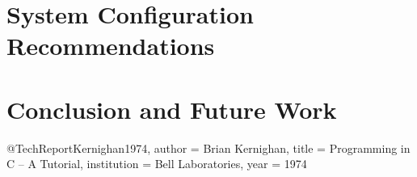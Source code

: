 \documentclass[english, version-2020-11]{uzl-thesis}
\begin{document}
\chapter{System Configuration Recommendations}


\chapter{Conclusion and Future Work}


\begin{bibtex-entries}
@TechReport{Kernighan1974,
author = {Brian Kernighan},
title = {Programming in C – A Tutorial},
institution = {Bell Laboratories},
year = {1974}
}
\end{bibtex-entries}
\end{document}
